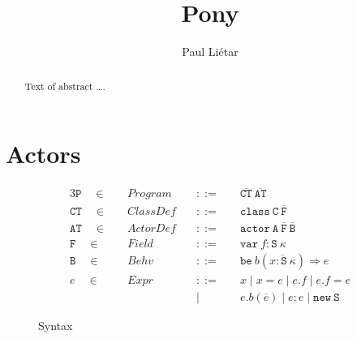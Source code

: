 \documentclass[format=acmsmall, authordraft, authorversion]{acmart}\settopmatter{printfolios=true,printccs=false,printacmref=false}
\newcommand{\seq}[1]{\overline{#1}}
\begin{document}
\title{Pony}
\author{Paul Li\'etar}

\begin{abstract}
Text of abstract \ldots.
\end{abstract}

\maketitle

\section{Actors}
\begin{figure}[ht!]
\centering
\begin{alignat*}{3}
    \mathtt{P}  \quad\in\quad& \mathit{Program}  \quad&::=&\quad \seq{\mathtt{CT}}\ \seq{\mathtt{AT}}\\
    \mathtt{CT} \quad\in\quad& \mathit{ClassDef} \quad&::=&\quad \mathtt{class}\ \mathtt{C}\ \seq{\mathtt{F}}\\
    \mathtt{AT} \quad\in\quad& \mathit{ActorDef} \quad&::=&\quad \mathtt{actor}\ \mathtt{A}\ \seq{\mathtt{F}}\ \seq{\mathtt{B}}\\
    \mathtt{F}  \quad\in\quad& \mathit{Field}    \quad&::=&\quad \mathtt{var}\ f : \mathtt{S}\ \kappa\\
    \mathtt{B}  \quad\in\quad& \mathit{Behv}     \quad&::=&\quad \mathtt{be}\ b(\seq{x: \mathtt{S}\ \kappa}) \Rightarrow e\\
    e           \quad\in\quad& \mathit{Expr}     \quad&::=&\quad x \mid x = e \mid e.f \mid e.f = e\\
                             &                   \quad&\mid&\quad e.b(\seq{e}) \mid e ; e \mid \mathtt{new}\ \mathtt{S}
\end{alignat*}
\caption{Syntax}
\end{figure}
\end{document}
